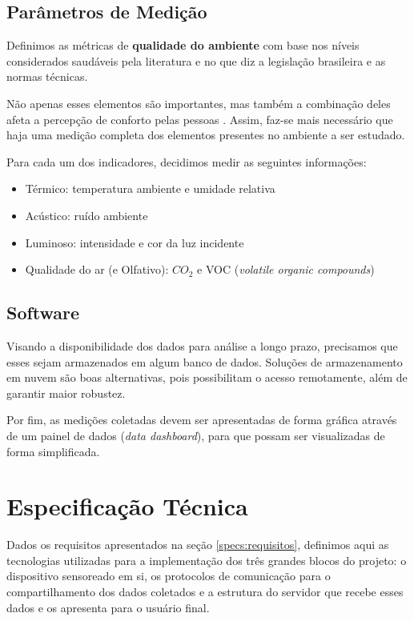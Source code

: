 \documentclass[../monografia.tex]{subfiles}
\begin{document}
\subsection{Parâmetros de Medição} \label{specs-parametros}

Definimos as métricas de \textbf{qualidade do ambiente} com base nos níveis considerados saudáveis pela literatura e no que diz a legislação brasileira e as normas técnicas. 

Não apenas esses elementos são importantes, mas também a combinação deles afeta a percepção de conforto pelas pessoas \cite{ComfortOffice}. Assim, faz-se mais necessário que haja uma medição completa dos elementos presentes no ambiente a ser estudado.  

Para cada um dos indicadores, decidimos medir as seguintes informações:

\begin{itemize}
\item Térmico: temperatura ambiente e umidade relativa
\item Acústico: ruído ambiente
\item Luminoso: intensidade e cor da luz incidente
\item Qualidade do ar (e Olfativo): $CO_{2}$ e VOC (\textit{volatile organic compounds})
\end{itemize}

\subsection{Software}

Visando a disponibilidade dos dados para análise a longo prazo, precisamos que esses sejam armazenados em algum banco de dados. Soluções de armazenamento em nuvem são boas alternativas, pois possibilitam o acesso remotamente, além de garantir maior robustez.

Por fim, as medições coletadas devem ser apresentadas de forma gráfica através de um painel de dados (\textit{data dashboard}), para que possam ser visualizadas de forma simplificada. 

\section{Especificação Técnica}%

Dados os requisitos apresentados na seção \ref{specs:requisitos}, definimos aqui as tecnologias utilizadas para a implementação dos três grandes blocos do projeto: o dispositivo sensoreado em si, os protocolos de comunicação para o compartilhamento dos dados coletados e a estrutura do servidor que recebe esses dados e os apresenta para o usuário final.
\end{document}
